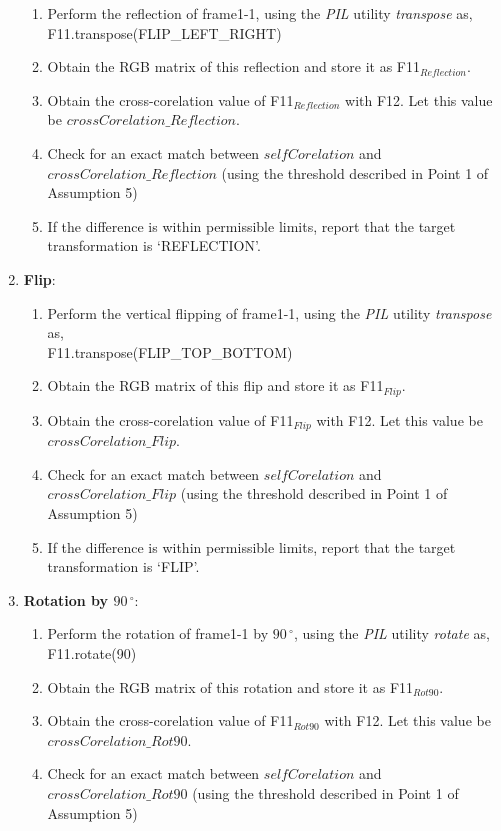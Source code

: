 \documentclass[10pt, letter]{article}
\begin{document}
\begin{enumerate}
\begin{enumerate}
	\item Perform the reflection of frame1-1, using the \emph{PIL} utility \emph{transpose} \cite{pil} as,\\
		\hspace*{3cm}F11.transpose(FLIP\_LEFT\_RIGHT)
	\item Obtain the RGB matrix of this reflection and store it as F11$_{Reflection}$.
	\item Obtain the cross-corelation value of F11$_{Reflection}$ with F12. Let this value be $crossCorelation\_Reflection$.
	\item Check for an exact match between $selfCorelation$ and $crossCorelation\_Reflection$ (using the threshold described in Point 1 of Assumption 5)
	\item If the difference is within permissible limits, report that the target transformation is `REFLECTION'.
\end{enumerate}

\item \textbf{Flip}:
\begin{enumerate}
	\item Perform the vertical flipping of frame1-1, using the \emph{PIL} utility \emph{transpose} \cite{pil} as,\\
		\hspace*{3cm}F11.transpose(FLIP\_TOP\_BOTTOM)
	\item Obtain the RGB matrix of this flip and store it as F11$_{Flip}$.
	\item Obtain the cross-corelation value of F11$_{Flip}$ with F12. Let this value be $crossCorelation\_Flip$.
	\item Check for an exact match between $selfCorelation$ and $crossCorelation\_Flip$ (using the threshold described in Point 1 of Assumption 5)
	\item If the difference is within permissible limits, report that the target transformation is `FLIP'.
\end{enumerate}

\item \textbf{Rotation by $90\,^{\circ}$}:
\begin{enumerate}
	\item Perform the rotation of frame1-1 by $90\,^{\circ}$, using the \emph{PIL} utility \emph{rotate} \cite{pil} as,\\
		\hspace*{3cm}F11.rotate(90)
	\item Obtain the RGB matrix of this rotation and store it as F11$_{Rot90}$.
	\item Obtain the cross-corelation value of F11$_{Rot90}$ with F12. Let this value be $crossCorelation\_Rot90$.
	\item Check for an exact match between $selfCorelation$ and $crossCorelation\_Rot90$ (using the threshold described in Point 1 of Assumption 5)


\end{enumerate}
\end{enumerate}
\end{document}
